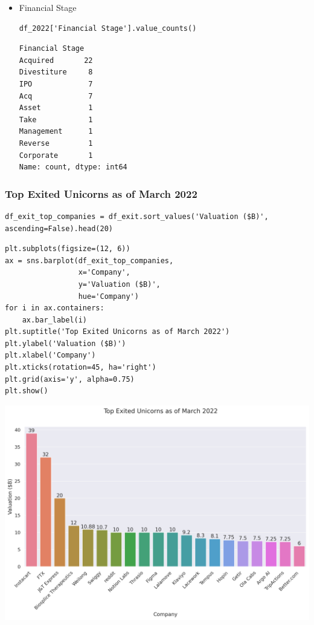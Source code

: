 \documentclass[a4paper,12pt]{article}
\begin{document}
\begin{itemize}
\item Financial Stage

\begin{verbatim}
df_2022['Financial Stage'].value_counts()
\end{verbatim}

\label{}
\begin{verbatim}
Financial Stage
Acquired       22
Divestiture     8
IPO             7
Acq             7
Asset           1
Take            1
Management      1
Reverse         1
Corporate       1
Name: count, dtype: int64
\end{verbatim}
\end{itemize}
\subsubsection{Top Exited Unicorns as of March 2022}
\label{sec:orgd9cdf2c}

\begin{verbatim}
df_exit_top_companies = df_exit.sort_values('Valuation ($B)', ascending=False).head(20)
\end{verbatim}

\begin{verbatim}
plt.subplots(figsize=(12, 6))
ax = sns.barplot(df_exit_top_companies,
                 x='Company',
                 y='Valuation ($B)',
                 hue='Company')
for i in ax.containers:
    ax.bar_label(i)
plt.suptitle('Top Exited Unicorns as of March 2022')
plt.ylabel('Valuation ($B)')
plt.xlabel('Company')
plt.xticks(rotation=45, ha='right')
plt.grid(axis='y', alpha=0.75)
plt.show()
\end{verbatim}

\begin{center}
\includegraphics[width=.9\linewidth]{./.ob-jupyter/133c08bd485e5a0c21963dce921420f21661f265.png}
\label{}
\end{center}
\end{document}
